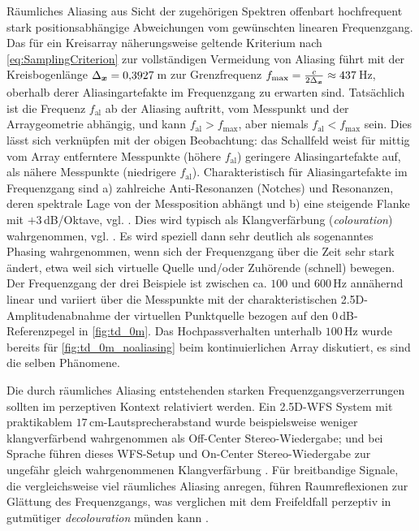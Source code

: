 


Räumliches Aliasing aus Sicht der zugehörigen Spektren offenbart
hochfrequent stark positionsabhängige Abweichungen vom gewünschten linearen
Frequenzgang.
%
Das für ein Kreisarray näherungsweise geltende Kriterium nach \Glg\eqref{eq:SamplingCriterion} zur vollständigen
Vermeidung von Aliasing
führt mit der Kreisbogenlänge
$\Delta_{\bm{x}}=0{,}3927$\,m zur Grenzfrequenz
$f_\text{max} = \frac{c}{2 \Delta_{\bm{x}}}\approx 437$\,Hz,
oberhalb derer Aliasingartefakte im Frequenzgang zu erwarten sind.
%
Tatsächlich ist die Frequenz $f_\text{al}$ ab der Aliasing auftritt,
vom Messpunkt und der Arraygeometrie abhängig, und
kann $f_\text{al}>f_\text{max}$, aber niemals $f_\text{al}<f_\text{max}$ sein.
%
Dies lässt sich verknüpfen mit der obigen Beobachtung: das Schallfeld
weist für mittig vom Array entferntere Messpunkte (höhere $f_\text{al}$) geringere
Aliasingartefakte auf, als nähere Messpunkte (niedrigere $f_\text{al}$).
%
Charakteristisch für Aliasingartefakte
im Frequenzgang sind a) zahlreiche Anti-Resonanzen (Notches) und Resonanzen,
deren spektrale Lage von der Messposition abhängt und
b) eine steigende Flanke mit $+3$\,dB/Oktave,
vgl. \cite{Spors2010a}.
%
Dies wird typisch als Klangverfärbung (\textit{colouration})
wahrgenommen, vgl. \cite{Start1997_diss, Wittek2007_JAES, Wierstorf2014_diss, Winter2019_diss, Erbes2020_diss}.
%
Es wird speziell dann sehr deutlich als sogenanntes Phasing wahrgenommen,
wenn sich der Frequenzgang über die Zeit sehr stark ändert, etwa weil sich
virtuelle Quelle und/oder Zuhörende (schnell) bewegen.
%
Der Frequenzgang der drei Beispiele ist zwischen ca. $100$ und $600$\,Hz
annähernd linear und variiert über die Messpunkte mit der charakteristischen
2.5D-Amplitudenabnahme der virtuellen Punktquelle bezogen auf den
$0$\,dB-Referenzpegel in \Abb\ref{fig:td_0m}.
%
Das Hochpassverhalten unterhalb $100$\,Hz wurde bereits für
\Abb\ref{fig:td_0m_noaliasing} beim kontinuierlichen Array diskutiert,
es sind die selben Phänomene.


Die durch räumliches Aliasing entstehenden starken Frequenzgangsverzerrungen
sollten im perzeptiven Kontext relativiert werden.
%
Ein 2.5D-WFS System mit praktikablem $17$\,cm-Lautsprecherabstand
wurde beispielsweise weniger klangverfärbend wahrgenommen als
Off-Center Stereo-Wiedergabe; und bei Sprache führen dieses WFS-Setup und On-Center
Stereo-Wiedergabe zur ungefähr gleich wahrgenommenen
Klangverfärbung \cite{Wierstorf2014_diss}.
%
Für breitbandige Signale, die vergleichsweise viel räumliches Aliasing anregen,
führen Raumreflexionen zur Glättung des Frequenzgangs, was verglichen mit dem
Freifeldfall perzeptiv in gutmütiger \textit{decolouration} münden kann
 \cite{Erbes2020_diss}.



